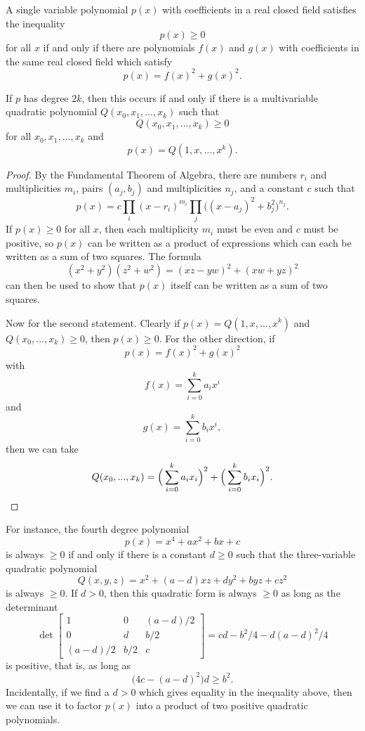 \begin{thm} A single variable polynomial $p(x)$ with coefficients in a real closed field satisfies the inequality
\[
p(x) \ge 0
\]
for all $x$ if and only if there are polynomials $f(x)$ and $g(x)$ with coefficients in the same real closed field which satisfy
\[
p(x) = f(x)^2 + g(x)^2.
\]

If $p$ has degree $2k$, then this occurs if and only if there is a multivariable quadratic polynomial $Q(x_0, x_1, ..., x_k)$ such that
\[
Q(x_0, x_1, ..., x_k) \ge 0
\]
for all $x_0, x_1, ..., x_k$ and
\[
p(x) = Q(1, x, ..., x^k).
\]
\end{thm}
\begin{proof} By the Fundamental Theorem of Algebra, there are numbers $r_i$ and multiplicities $m_i$, pairs $(a_j, b_j)$ and multiplicities $n_j$, and a constant $c$ such that
\[
p(x) = c\prod_i (x - r_i)^{m_i} \prod_j \big((x-a_j)^2 + b_j^2\big)^{n_j}.
\]
If $p(x) \ge 0$ for all $x$, then each multiplicity $m_i$ must be even and $c$ must be positive, so $p(x)$ can be written as a product of expressions which can each be written as a sum of two squares. The formula
\[
(x^2 + y^2)(z^2 + w^2) = (xz - yw)^2 + (xw + yz)^2
\]
can then be used to show that $p(x)$ itself can be written as a sum of two squares.

Now for the second statement. Clearly if $p(x) = Q(1, x, ..., x^k)$ and $Q(x_0, ..., x_k) \ge 0$, then $p(x) \ge 0$. For the other direction, if
\[
p(x) = f(x)^2 + g(x)^2
\]
with
\[
f(x) = \sum_{i=0}^k a_i x^i
\]
and
\[
g(x) = \sum_{i=0}^k b_i x^i,
\]
then we can take
\[
Q(x_0, ..., x_k) = \Big(\sum_{i=0}^k a_ix_i\Big)^2 + \Big(\sum_{i=0}^k b_ix_i\Big)^2.\qedhere
\]
\end{proof}

For instance, the fourth degree polynomial
\[
p(x) = x^4 + ax^2 + bx + c
\]
is always $\ge 0$ if and only if there is a constant $d \ge 0$ such that the three-variable quadratic polynomial
\[
Q(x,y,z) = x^2 + (a-d)xz + dy^2 + byz + cz^2
\]
is always $\ge 0$. If $d > 0$, then this quadratic form is always $\ge 0$ as long as the determinant
\[
\det\begin{bmatrix} 1 & 0 & (a-d)/2\\ 0 & d & b/2\\ (a-d)/2 & b/2 & c\end{bmatrix} = cd - b^2/4 - d(a-d)^2/4
\]
is positive, that is, as long as
\[
\big(4c - (a-d)^2\big)d \ge b^2.
\]
Incidentally, if we find a $d > 0$ which gives equality in the inequality above, then we can use it to factor $p(x)$ into a product of two positive quadratic polynomials.

